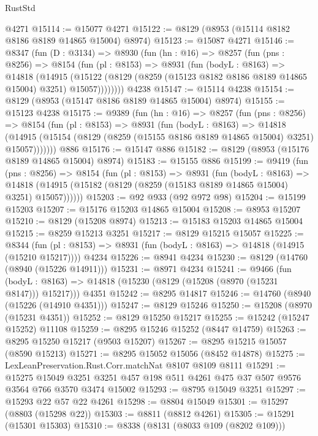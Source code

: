 \begin{lexlean}{RustStd}
\begin{coremodule}
    @4271
@15114 := @15077 @4271
@15122 := @8129 (@8953 (@15114 @8182 @8186 @8189 @14865 @15004) @8974)
@15123 := @15087 @4271
@15146 := @8347
    (fun (D : @3134) =>
    @8930
      (fun (hn : @16) =>
      @8257
        (fun (pns : @8256) =>
        @8154
          (fun (pl : @8153) =>
          @8931
            (fun (bodyL : @8163) =>
            @14818
              (@14915
                (@15122 (@8129 (@8259 (@15123 @8182 @8186 @8189 @14865 @15004) @3251) @15057))))))))
    @4238
@15147 := @15114 @4238
@15154 := @8129 (@8953 (@15147 @8186 @8189 @14865 @15004) @8974)
@15155 := @15123 @4238
@15175 := @9389
    (fun (hn : @16) =>
    @8257
      (fun (pns : @8256) =>
      @8154
        (fun (pl : @8153) =>
        @8931
          (fun (bodyL : @8163) =>
          @14818
            (@14915 (@15154 (@8129 (@8259 (@15155 @8186 @8189 @14865 @15004) @3251) @15057)))))))
    @886
@15176 := @15147 @886
@15182 := @8129 (@8953 (@15176 @8189 @14865 @15004) @8974)
@15183 := @15155 @886
@15199 := @9419
    (fun (pns : @8256) =>
    @8154
      (fun (pl : @8153) =>
      @8931
        (fun (bodyL : @8163) =>
        @14818 (@14915 (@15182 (@8129 (@8259 (@15183 @8189 @14865 @15004) @3251) @15057))))))
@15203 := @92 @933 (@92 @972 @98)
@15204 := @15199 @15203
@15207 := @15176 @15203 @14865 @15004
@15208 := @8953 @15207
@15210 := @8129 (@15208 @8974)
@15213 := @15183 @15203 @14865 @15004
@15215 := @8259 @15213 @3251
@15217 := @8129 @15215 @15057
@15225 := @8344
    (fun (pl : @8153) => @8931 (fun (bodyL : @8163) => @14818 (@14915 (@15210 @15217))))
    @4234
@15226 := @8941 @4234
@15230 := @8129 (@14760 (@8940 (@15226 @14911)))
@15231 := @8971 @4234
@15241 := @9466
    (fun (bodyL : @8163) => @14818 (@15230 (@8129 (@15208 (@8970 (@15231 @8147))) @15217)))
    @4351
@15242 := @8295 @14817
@15246 := @14760 (@8940 (@15226 (@14910 @4351)))
@15247 := @8129 @15246
@15250 := @15208 (@8970 (@15231 @4351))
@15252 := @8129 @15250 @15217
@15255 := @15242 (@15247 @15252) @11108
@15259 := @8295 @15246 @15252 (@8447 @14759)
@15263 := @8295 @15250 @15217 (@9503 @15207)
@15267 := @8295 @15215 @15057 (@8590 @15213)
@15271 := @8295 @15052 @15056 (@8452 @14878)
@15275 := LexLeanPreservation.Rust.Corr.matchNat @8107 @8109 @8111
@15291 := @15275
    @15049
    @3251
    @3251
    @457
    @198
    @511
    @4261
    @475
    @37
    @507
    @9576
    @3564
    @766
    @3570
    @3474
    @15002
@15293 := @8795 @15049 @3251
@15297 := @15293 @22 @57 @22 @4261
@15298 := @8804 @15049
@15301 := @15297 (@8803 (@15298 @22))
@15303 := @8811 (@8812 @4261)
@15305 := @15291 (@15301 @15303)
@15310 := @8338 (@8131 (@8033 @109 (@8202 @109)))

\end{coremodule}
\end{lexlean}
